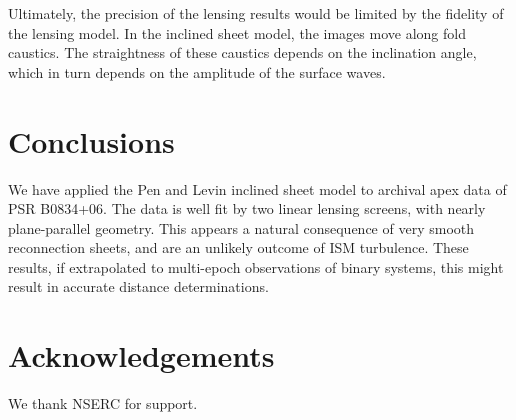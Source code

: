 \documentclass[useAMS,usenatbib]{mn2e}
\begin{document}
Ultimately, the precision of the lensing results would be limited by
the fidelity of the lensing model.  In the inclined sheet model, the
images move along fold caustics.  The straightness of these caustics
depends on the inclination angle, which in turn depends on the
amplitude of the surface waves.  

\section{Conclusions}

We have applied the Pen and Levin \citet{2014MNRAS.442.3338P} inclined
sheet model to archival apex data of PSR B0834+06.  The data is well
fit by two linear lensing screens, with nearly plane-parallel
geometry.  This appears a natural consequence of very smooth
reconnection sheets, and are an unlikely outcome of ISM turbulence.
These results, if extrapolated to multi-epoch observations of binary
systems, this might result in accurate distance determinations.


\section{Acknowledgements}

We thank NSERC for support.


\newcommand{\araa}{ARA\&A}   %
\newcommand{\afz}{Afz}       %
\newcommand{\aj}{AJ}         %
\newcommand{\azh}{AZh}       %
\newcommand{\aaa}{A\&A}      %
\newcommand{\aas}{A\&AS}     %
\newcommand{\aar}{A\&AR}     %
\newcommand{\apj}{ApJ}       %
\newcommand{\apjs}{ApJS}     %
\newcommand{\apjl}{ApJ}      %
\newcommand{\apss}{Ap\&SS}   %
\newcommand{\baas}{BAAS}     %
\newcommand{\jaa}{JA\&A}     %
\newcommand{\mnras}{MNRAS}   %
\newcommand{\nat}{Nat}       %
\newcommand{\pasj}{PASJ}     %
\newcommand{\pasp}{PASP}     %
\newcommand{\paspc}{PASPC}   %
\newcommand{\qjras}{QJRAS}   %
\newcommand{\sci}{Sci}       %
\newcommand{\solphys}{Solar Physics}       %
\newcommand{\sova}{SvA}      %
\newcommand{\aap}{A\&A}
\newcommand\jcap{{J. Cosmology Astropart. Phys.}}%
\newcommand{\prd}{Phys. Rev. D}






\label{lastpage}
\end{document}
